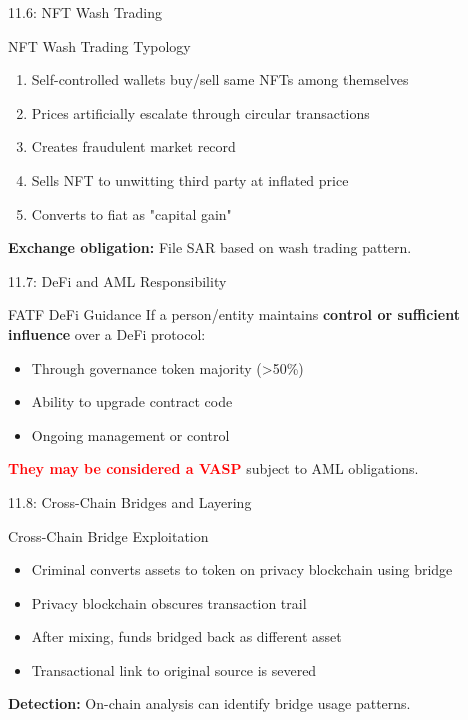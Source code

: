 \documentclass{beamer}
\begin{document}
	\begin{frame}{11.6: NFT Wash Trading}
		\begin{block}{NFT Wash Trading Typology}
			\begin{enumerate}
				\item Self-controlled wallets buy/sell same NFTs among themselves
				\item Prices artificially escalate through circular transactions
				\item Creates fraudulent market record
				\item Sells NFT to unwitting third party at inflated price
				\item Converts to fiat as "capital gain"
			\end{enumerate}
		\end{block}
		\textbf{Exchange obligation:} File SAR based on wash trading pattern.
	\end{frame}
	
	\begin{frame}{11.7: DeFi and AML Responsibility}
		\begin{block}{FATF DeFi Guidance}
			If a person/entity maintains \textbf{control or sufficient influence} over a DeFi protocol:
			\begin{itemize}
				\item Through governance token majority (>50\%)
				\item Ability to upgrade contract code
				\item Ongoing management or control
			\end{itemize}
			\textcolor{red}{\textbf{They may be considered a VASP}} subject to AML obligations.
		\end{block}
	\end{frame}
	
	\begin{frame}{11.8: Cross-Chain Bridges and Layering}
		\begin{block}{Cross-Chain Bridge Exploitation}
			\begin{itemize}
				\item Criminal converts assets to token on privacy blockchain using bridge
				\item Privacy blockchain obscures transaction trail
				\item After mixing, funds bridged back as different asset
				\item Transactional link to original source is severed
			\end{itemize}
		\end{block}
		\textbf{Detection:} On-chain analysis can identify bridge usage patterns.
	\end{frame}
	
\end{document}
